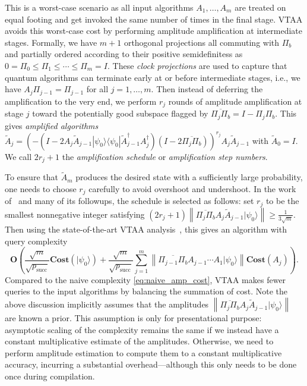 \documentclass[letterpaper,onecolumn,11pt,accepted=2026-02-14]{quantumarticle}
\newcommand{\norm}[1]{\left\lVert#1\right\rVert}
\theoremstyle{remark}
\theoremstyle{plain}
\newcommand{\eq}[1]{\cref{eq:#1}}
\newcommand{\ket}[1]{|#1\rangle}
\newcommand{\bra}[1]{\langle#1|}
\newcommand{\ketbra}[2]{\ket{#1}\!\bra{#2}}
\begin{document}
This is a worst-case scenario as all input algorithms $A_1,\ldots,A_m$ are treated on equal footing and get invoked the same number of times in the final stage. VTAA avoids this worst-case cost by performing amplitude amplification at intermediate stages. Formally, we have $m+1$ orthogonal projections all commuting with $\Pi_b$ and partially ordered according to their positive semidefinitess as $0=\Pi_0\leq\Pi_1\leq\cdots\leq\Pi_m=I$. These \emph{clock projections} are used to capture that quantum algorithms can terminate early at or before intermediate stages, i.e., we have $A_j\Pi_{j-1}=\Pi_{j-1}$ for all $j=1,\ldots,m$. Then instead of deferring the amplification to the very end, we perform $r_j$ rounds of amplitude amplification at stage $j$ toward the potentially good subspace flagged by $\overline{\Pi_j\Pi_b}=I-\Pi_j\Pi_b$. This gives \emph{amplified algorithms} $\widetilde A_j
    =\left(-\left(I-2A_j\widetilde A_{j-1}\ketbra{\psi_0}{\psi_0}\widetilde A_{j-1}^\dagger A_j^\dagger\right)\left(I-2\overline{\Pi_j\Pi_b}\right)\right)^{r_j}A_j\widetilde A_{j-1}$ with $\widetilde A_0=I$.
We call $2r_j+1$ the \emph{amplification schedule} or \emph{amplification step numbers}.

To ensure that $\widetilde A_m$ produces the desired state with a sufficiently large probability, one needs to choose $r_j$ carefully to avoid overshoot and undershoot. In the work of~\cite{Ambainis2012VTAA} and many of its followups, the schedule is selected as follows:
set $r_j$ to be the smallest nonnegative integer satisfying $(2r_j+1)\norm{\overline{\Pi_j\Pi_b}A_j\widetilde A_{j-1}\ket{\psi_0}}
        \geq\frac{1}{3\sqrt{m}}$.
Then using the state-of-the-art VTAA analysis~\cite[Lemma 10]{Chakraborty2023VTAAQLSP}, this gives an algorithm with query complexity
\begin{equation}
\label{eq:vtaa_cost}
    \mathbf{O}\left(\frac{\sqrt{m}}{\sqrt{p_{\text{succ}}}}\mathbf{Cost}\left(\ket{\psi_0}\right)
    +\frac{\sqrt{m}}{\sqrt{p_{\text{succ}}}}\sum_{j=1}^m\norm{\overline{\Pi_{j-1}\Pi_b}A_{j-1}\cdots A_1\ket{\psi_0}}\mathbf{Cost}\left(A_j\right)\right).
\end{equation}
Compared to the naive complexity \eq{naive_amp_cost}, VTAA makes fewer queries to the input algorithms by balancing the summation of cost.
Note the above discussion implicitly assumes that the amplitudes $\norm{\overline{\Pi_j\Pi_b}A_j\widetilde A_{j-1}\ket{\psi_0}}$ are known a prior. This assumption is only for presentational purpose: asymptotic scaling of the complexity remains the same if we instead have a constant multiplicative estimate of the amplitudes. Otherwise, we need to perform amplitude estimation to compute them to a constant multiplicative accuracy, incurring a substantial overhead---although this only needs to be done once during compilation.
\end{document}
